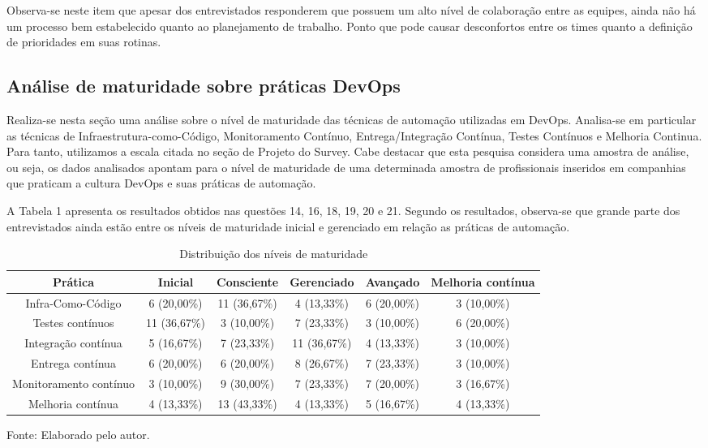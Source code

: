 \documentclass[twoside,english,brazilian]{UNISINOSartigo}
\newcommand{\source}[1]{\caption*{Fonte: {#1}} }
\begin{document}
Observa-se neste item que apesar dos entrevistados responderem que possuem um alto nível de colaboração entre as equipes, ainda não há um processo bem estabelecido quanto ao planejamento de trabalho. Ponto que pode causar desconfortos entre os times quanto a definição de prioridades em suas rotinas.

\subsection{Análise de maturidade sobre práticas DevOps}
Realiza-se nesta seção uma análise sobre o nível de maturidade das técnicas de automação utilizadas em DevOps. Analisa-se em particular as técnicas de Infraestrutura-como-Código, Monitoramento Contínuo, Entrega/Integração Contínua, Testes Contínuos e Melhoria Continua. Para tanto, utilizamos a escala citada no seção de Projeto do Survey.  Cabe destacar que esta pesquisa considera uma amostra de análise, ou seja, os dados analisados apontam para o nível de maturidade de uma determinada amostra de profissionais inseridos em companhias que praticam a cultura DevOps e suas práticas de automação.

A Tabela 1 apresenta os resultados obtidos nas questões 14, 16, 18, 19, 20 e 21. Segundo os resultados, observa-se que grande parte dos entrevistados ainda estão entre os níveis de maturidade inicial e gerenciado em relação as práticas de automação.
\setlength{\belowcaptionskip}{0.0pt}
\begin{table}[H]
\footnotesize
\caption{Distribuição dos níveis de maturidade}
    \begin{tabularx}{\columnwidth}{cccccc}
    \hline
       Prática                  &    Inicial &    Consciente &    Gerenciado &    Avançado &    Melhoria contínua \\ \hline 
       Infra-Como-Código        &    6 (20,00\%)  &    11 (36,67\%)    &    4 (13,33\%)    &    6 (20,00\%)  &    3 (10,00\%)           \\
       Testes   contínuos       &    11 (36,67\%) &    3 (10,00\%)    &    7 (23,33\%)    &    3 (10,00\%)  &    6 (20,00\%)           \\
       Integração   contínua    &    5 (16,67\%)  &    7 (23,33\%)    &    11 (36,67\%)    &    4 (13,33\%)  &    3 (10,00\%)           \\
       Entrega   contínua       &    6 (20,00\%) &    6 (20,00\%)    &    8 (26,67\%)    &    7 (23,33\%)  &    3 (10,00\%)           \\ 
       Monitoramento   contínuo &    3 (10,00\%) &    9 (30,00\%)    &    7 (23,33\%)    &    7 (20,00\%)  &    3 (16,67\%)           \\
       Melhoria   contínua      &    4 (13,33\%) &    13 (43,33\%)    &    4 (13,33\%)    &    5 (16,67\%)  &    4 (13,33\%)           \\ \hline
    \end{tabularx}
    \source{Elaborado pelo autor.}
\end{table}
\end{document}
